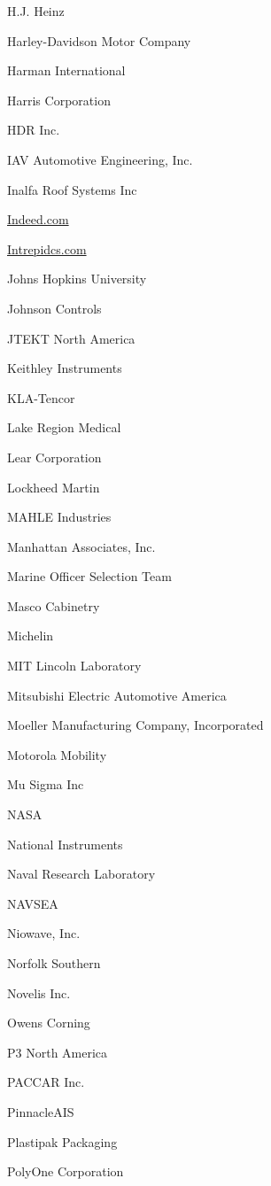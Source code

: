 \documentclass[twoside]{article}
\begin{document}
\begin{center}
\begin{multicols}{5}
\begin{FlushLeft}
\begin{compactitem}
\item H.J. Heinz
\item Harley-Davidson Motor Company
\item Harman International
\item Harris Corporation
\item HDR Inc.
\item IAV Automotive Engineering, Inc.
\item Inalfa Roof Systems Inc
\item \url{Indeed.com}
\item \url{Intrepidcs.com}
\item Johns Hopkins University
\item Johnson Controls
\item JTEKT North America
\item Keithley Instruments
\item KLA-Tencor
\item Lake Region Medical
\item Lear Corporation
\item Lockheed Martin
\item MAHLE Industries
\item Manhattan Associates, Inc.
\item Marine Officer Selection Team
\item Masco Cabinetry
\item Michelin
\item MIT Lincoln Laboratory
\item Mitsubishi Electric Automotive America
\item Moeller Manufacturing Company, Incorporated
\item Motorola Mobility
\item Mu Sigma Inc
\item NASA
\item National Instruments
\item Naval Research Laboratory
\item NAVSEA
\item Niowave, Inc.
\item Norfolk Southern
\item Novelis Inc.
\item Owens Corning
\item P3 North America
\item PACCAR Inc.
\item PinnacleAIS
\item Plastipak Packaging
\item PolyOne Corporation

\end{compactitem}
\end{FlushLeft}
\end{multicols}
\end{center}
\end{document}
